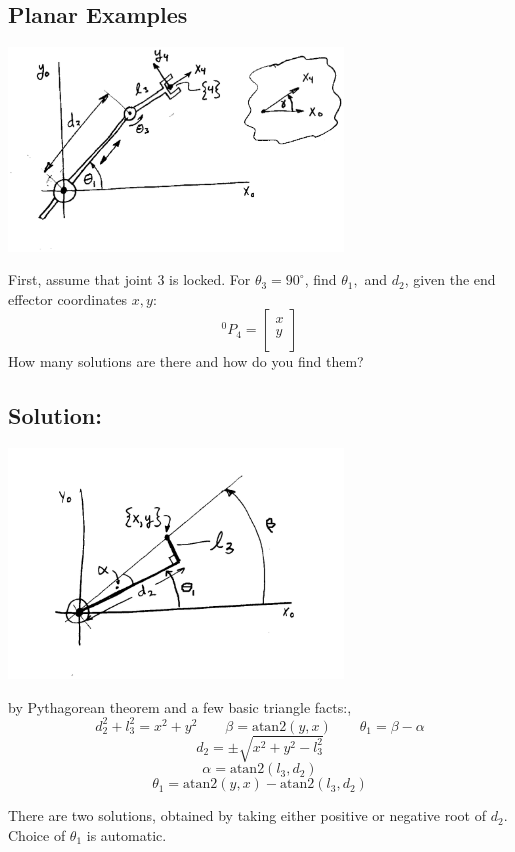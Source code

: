 \subsection{Planar Examples}
\begin{ExampleSmall}

\includegraphics[width=3.5in]{figs04/00087.eps}


First, assume that joint 3 is locked.
For $\theta_3 = 90^\circ$, find $\theta_1,$ and $d_2$, given the end effector
coordinates $x,y$:
\[
^0P_4 = \left[
\begin{array}{c}
x\\
y\\
\end{array}
\right]
\]
How many solutions are there and how do you find them?

\subsection*{Solution:}

\includegraphics[width=3.5in]{figs04/00088.png}

by Pythagorean theorem and a few basic triangle facts:,
\[
d_2^2 + l_3^2 = x^2 + y^2
\qquad
\beta = \mathrm{atan2}(y,x)
\qquad
\theta_1 = \beta - \alpha
\]
\[
d_2 = \pm\sqrt{x^2 + y^2-l_3^2}
\]
\[
\alpha = \mathrm{atan2}(l_3, d_2)
\]
\[
\theta_1 = \mathrm{atan2}(y,x)-\mathrm{atan2}(l_3, d_2)
\]

There are two solutions, obtained by taking either positive or
negative root of $d_2$.  Choice of $\theta_1$ is automatic.

\end{ExampleSmall}

